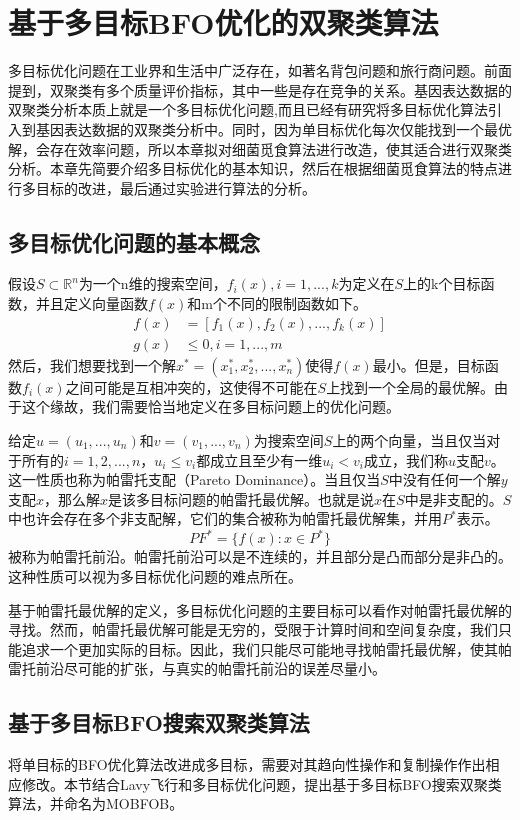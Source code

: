 \chapter{基于多目标BFO优化的双聚类算法}
多目标优化问题在工业界和生活中广泛存在，如著名背包问题和旅行商问题。前面提到，双聚类有多个质量评价指标，其中一些是存在竞争的关系。基因表达数据的双聚类分析本质上就是一个多目标优化问题,而且已经有研究将多目标优化算法引入到基因表达数据的双聚类分析中。同时，因为单目标优化每次仅能找到一个最优解，会存在效率问题，所以本章拟对细菌觅食算法进行改造，使其适合进行双聚类分析。本章先简要介绍多目标优化的基本知识，然后在根据细菌觅食算法的特点进行多目标的改进，最后通过实验进行算法的分析。

\section{多目标优化问题的基本概念}
假设$S\subset \mathbb{R}^n$为一个n维的搜索空间，$f_i(x),i=1,...,k$为定义在$S$上的k个目标函数，并且定义向量函数$f(x)$和m个不同的限制函数如下。
\begin{align}
   f(x) &= [f_1(x),f_2(x),...,f_k(x)] \\
    g(x) &\leq 0, i= 1,...,m
\end{align}
然后，我们想要找到一个解$x^{\ast} =(x_1^{\ast},x_2^{\ast},...,x_n^{\ast})$使得$f(x)$最小。但是，目标函数$f_i(x)$之间可能是互相冲突的，这使得不可能在$S$上找到一个全局的最优解。由于这个缘故，我们需要恰当地定义在多目标问题上的优化问题。

给定$u=(u_1,...,u_n)$和$v=(v_1,...,v_n)$为搜索空间$S$上的两个向量，当且仅当对于所有的$i=1,2,...,n$，$u_i \le v_i$都成立且至少有一维$u_i<v_i$成立，我们称$u$支配$v$。这一性质也称为帕雷托支配（Pareto Dominance）。当且仅当$S$中没有任何一个解$y$支配$x$，那么解$x$是该多目标问题的帕雷托最优解。也就是说$x$在$S$中是非支配的。$S$中也许会存在多个非支配解，它们的集合被称为帕雷托最优解集，并用$P^*$表示。
\begin{equation}
   PF^* = \{f(x): x\in P^*\} 
\end{equation}
被称为帕雷托前沿。帕雷托前沿可以是不连续的，并且部分是凸而部分是非凸的。这种性质可以视为多目标优化问题的难点所在。

基于帕雷托最优解的定义，多目标优化问题的主要目标可以看作对帕雷托最优解的寻找。然而，帕雷托最优解可能是无穷的，受限于计算时间和空间复杂度，我们只能追求一个更加实际的目标。因此，我们只能尽可能地寻找帕雷托最优解，使其帕雷托前沿尽可能的扩张，与真实的帕雷托前沿的误差尽量小。

\section{基于多目标BFO搜索双聚类算法}
将单目标的BFO优化算法改进成多目标，需要对其趋向性操作和复制操作作出相应修改。本节结合Lavy飞行和多目标优化问题，提出基于多目标BFO搜索双聚类算法，并命名为MOBFOB。

